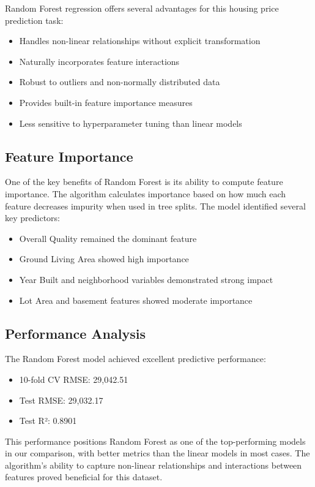 \documentclass[12pt]{report}
\begin{document}
Random Forest regression offers several advantages for this housing price prediction task:
\begin{itemize}
    \item Handles non-linear relationships without explicit transformation
    \item Naturally incorporates feature interactions
    \item Robust to outliers and non-normally distributed data
    \item Provides built-in feature importance measures
    \item Less sensitive to hyperparameter tuning than linear models
\end{itemize}

\subsection{Feature Importance}
One of the key benefits of Random Forest is its ability to compute feature importance. The algorithm calculates importance based on how much each feature decreases impurity when used in tree splits. The model identified several key predictors:

\begin{itemize}
    \item Overall Quality remained the dominant feature
    \item Ground Living Area showed high importance
    \item Year Built and neighborhood variables demonstrated strong impact
    \item Lot Area and basement features showed moderate importance
\end{itemize}

\subsection{Performance Analysis}
The Random Forest model achieved excellent predictive performance:
\begin{itemize}
    \item 10-fold CV RMSE: 29,042.51
    \item Test RMSE: 29,032.17
    \item Test R²: 0.8901
\end{itemize}

This performance positions Random Forest as one of the top-performing models in our comparison, with better metrics than the linear models in most cases. The algorithm's ability to capture non-linear relationships and interactions between features proved beneficial for this dataset.
\end{document}
